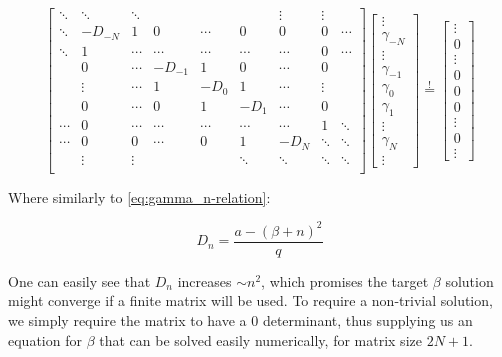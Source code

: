 \begin{equation}
\begin{bmatrix}
\ddots & \ddots & \ddots & & & & \vdots & \vdots & \\
\ddots & -D_{-N} & 1 & 0 & \cdots & 0 & 0 & 0 & \cdots \\
\ddots & 1 & \cdots & \cdots & \cdots & \cdots & \cdots & 0 & \cdots \\
& 0 & \cdots & -D_{-1} & 1 & 0 & \cdots & 0 & \\
& \vdots & \cdots & 1 & -D_0 & 1 & \cdots & \vdots & \\
& 0 & \cdots & 0 & 1 & -D_{1} & \cdots & 0 & \\
\cdots & 0 & \cdots & \cdots & \cdots & \cdots & \cdots & 1 & \ddots \\
\cdots & 0 & 0 & \cdots & 0 & 1 & -D_{N} & \ddots & \ddots \\
& \vdots & \vdots & & & \ddots & \ddots & \ddots & \ddots \\
\end{bmatrix}
\begin{bmatrix}
\vdots \\
\gamma_{-N} \\
\vdots \\
\gamma_{-1} \\
\gamma_0 \\
\gamma_{1} \\
\vdots \\
\gamma_{N} \\
\vdots
\end{bmatrix}
\overset{!}{=}
\begin{bmatrix}
\vdots \\
0 \\
\vdots \\
0 \\
0 \\
0 \\
\vdots \\
0 \\
\vdots
\end{bmatrix}
\end{equation}

Where similarly to \ref{eq:gamma_n-relation}:

$$D_n = \frac{a - \left(\beta + n\right)^2}{q}$$

One can easily see that $D_n$ increases $\sim n^2$, which promises the target $\beta$ solution might converge if a finite matrix will be used. To require a non-trivial solution, we simply require the matrix to have a $0$ determinant, thus supplying us an equation for $\beta$ that can be solved easily numerically, for matrix size $2N+1$.

